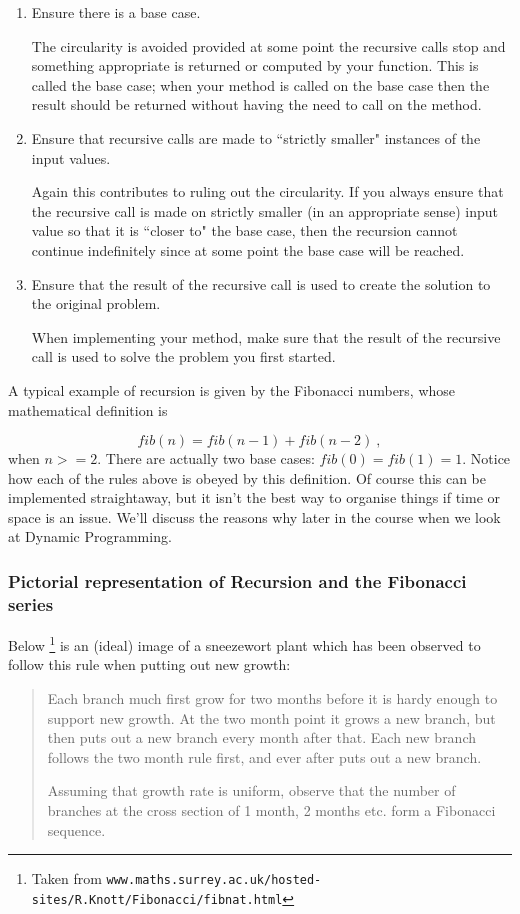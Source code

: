 \documentclass[twoside=false,DIV=14]{scrartcl}
\begin{document}
\begin{enumerate}
\item Ensure there is a base case. 

The circularity is avoided provided at some point the recursive calls stop and something appropriate is returned or computed by your function. This is called the base case; when your method is called on the base case then the result should be returned without having the need to call on the method.

\item Ensure that recursive calls are made to ``strictly smaller" instances of the input values.

Again this contributes to ruling out the circularity. If you always ensure that the recursive call is made on strictly smaller (in an appropriate sense) input value so that it is ``closer to" the base case, then the recursion cannot continue indefinitely since at some point the base case will be reached.

\item Ensure that the result of the recursive call is used to create the solution to the original problem.

When implementing your method, make sure that the result of the recursive call is used to solve the problem you first started. 
\end{enumerate}

A typical example of recursion is given by the Fibonacci numbers, whose mathematical definition is

\[
\textit{fib}(n)= \textit{fib}(n-1) + \textit{fib}(n-2)~,
\]
when $n>=2$. There are actually two base cases: $\textit{fib}(0)=\textit{fib}(1)=1$. Notice how each of the rules above is obeyed by this definition. Of course this can be implemented straightaway, but it isn't the best way to organise things if time or space is an issue. We'll discuss the reasons why later in the course when we look at Dynamic Programming.

\subsubsection*{Pictorial representation of Recursion and the Fibonacci series}

Below \footnote{Taken from {\tt  www.maths.surrey.ac.uk/hosted-sites/R.Knott/Fibonacci/fibnat.html}} is an (ideal) image of a sneezewort plant which has been observed to follow this rule when putting out new growth: 

\begin{quotation}
Each branch much first grow for two months before it is hardy enough to support new growth. At the two month point it grows a new branch, but then puts out a new branch every month after that. Each new branch follows the two month rule first, and ever after puts out a new branch.

Assuming that growth rate is uniform, observe that the number of branches at the cross section of 1 month, 2 months etc. form a Fibonacci sequence.
\end{quotation}
\end{document}
